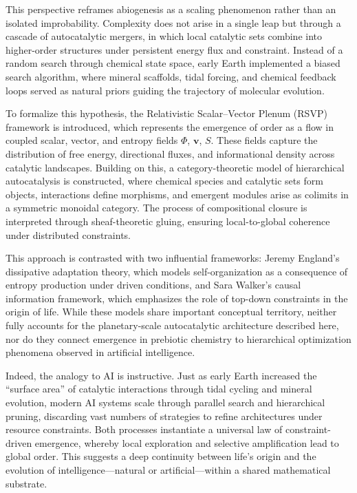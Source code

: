 \documentclass{book}
\begin{document}
This perspective reframes abiogenesis as a scaling phenomenon rather than an isolated improbability. Complexity does not arise in a single leap but through a cascade of autocatalytic mergers, in which local catalytic sets combine into higher-order structures under persistent energy flux and constraint. Instead of a random search through chemical state space, early Earth implemented a biased search algorithm, where mineral scaffolds, tidal forcing, and chemical feedback loops served as natural priors guiding the trajectory of molecular evolution.

To formalize this hypothesis, the Relativistic Scalar–Vector Plenum (RSVP) framework is introduced, which represents the emergence of order as a flow in coupled scalar, vector, and entropy fields $\Phi$, $\mathbf{v}$, $S$. These fields capture the distribution of free energy, directional fluxes, and informational density across catalytic landscapes. Building on this, a category-theoretic model of hierarchical autocatalysis is constructed, where chemical species and catalytic sets form objects, interactions define morphisms, and emergent modules arise as colimits in a symmetric monoidal category. The process of compositional closure is interpreted through sheaf-theoretic gluing, ensuring local-to-global coherence under distributed constraints.

This approach is contrasted with two influential frameworks: Jeremy England’s dissipative adaptation theory, which models self-organization as a consequence of entropy production under driven conditions, and Sara Walker’s causal information framework, which emphasizes the role of top-down constraints in the origin of life. While these models share important conceptual territory, neither fully accounts for the planetary-scale autocatalytic architecture described here, nor do they connect emergence in prebiotic chemistry to hierarchical optimization phenomena observed in artificial intelligence.

Indeed, the analogy to AI is instructive. Just as early Earth increased the “surface area” of catalytic interactions through tidal cycling and mineral evolution, modern AI systems scale through parallel search and hierarchical pruning, discarding vast numbers of strategies to refine architectures under resource constraints. Both processes instantiate a universal law of constraint-driven emergence, whereby local exploration and selective amplification lead to global order. This suggests a deep continuity between life’s origin and the evolution of intelligence—natural or artificial—within a shared mathematical substrate.
\end{document}
